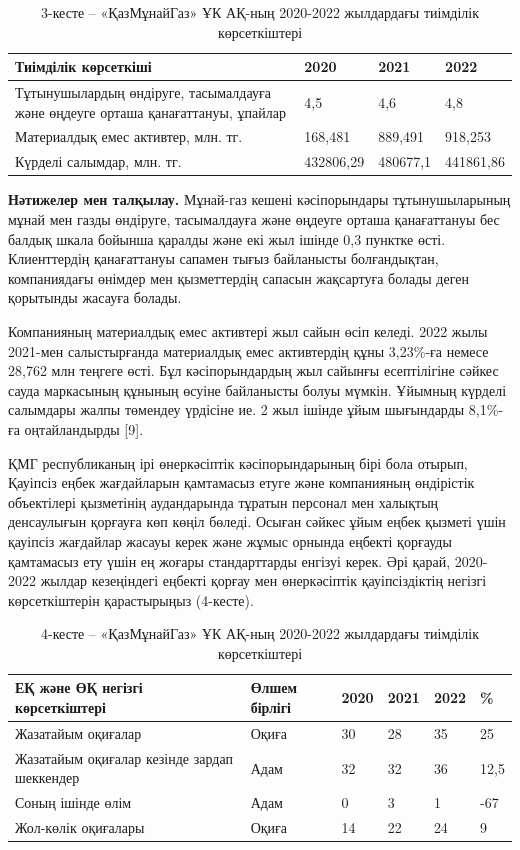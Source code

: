 \begin{table}[H]
\caption*{3-кесте -- «ҚазМұнайГаз» ҰК АҚ-ның 2020-2022 жылдардағы тиімділік көрсеткіштері}
\centering
\begin{tabular}{|p{}|l|l|l|}
\hline
Тиімділік көрсеткіші & 2020 & 2021 & 2022 \\ \hline
Тұтынушылардың өндіруге, тасымалдауға және өңдеуге орташа қанағаттануы, ұпайлар & 4,5 & 4,6 & 4,8 \\ \hline
Материалдық емес активтер, млн. тг. & 168,481 & 889,491 & 918,253 \\ \hline
Күрделі салымдар, млн. тг. & 432806,29 & 480677,1 & 441861,86 \\ \hline
\end{tabular}
\end{table}

\begin{multicols}{2}
{\bfseries Нәтижелер мен талқылау.} Мұнай-газ кешені кәсіпорындары
тұтынушыларының мұнай мен газды өндіруге, тасымалдауға және өңдеуге
орташа қанағаттануы бес балдық шкала бойынша қаралды және екі жыл ішінде
0,3 пунктке өсті. Клиенттердің қанағаттануы сапамен тығыз байланысты
болғандықтан, компаниядағы өнімдер мен қызметтердің сапасын жақсартуға
болады деген қорытынды жасауға болады.

Компанияның материалдық емес активтері жыл сайын өсіп келеді. 2022 жылы
2021-мен салыстырғанда материалдық емес активтердің құны 3,23\%-ға
немесе 28,762 млн теңгеге өсті. Бұл кәсіпорындардың жыл сайынғы
есептілігіне сәйкес сауда маркасының құнының өсуіне байланысты болуы
мүмкін. Ұйымның күрделі салымдары жалпы төмендеу үрдісіне ие. 2 жыл
ішінде ұйым шығындарды 8,1\%-ға оңтайландырды {[}9{]}.

ҚМГ республиканың ірі өнеркәсіптік кәсіпорындарының бірі бола отырып,
Қауіпсіз еңбек жағдайларын қамтамасыз етуге және компанияның өндірістік
объектілері қызметінің аудандарында тұратын персонал мен халықтың
денсаулығын қорғауға көп көңіл бөледі. Осыған сәйкес ұйым еңбек қызметі
үшін қауіпсіз жағдайлар жасауы керек және жұмыс орнында еңбекті қорғауды
қамтамасыз ету үшін ең жоғары стандарттарды енгізуі керек. Әрі қарай,
2020-2022 жылдар кезеңіндегі еңбекті қорғау мен өнеркәсіптік
қауіпсіздіктің негізгі көрсеткіштерін қарастырыңыз (4-кесте).
\end{multicols}

\begin{table}[H]
\caption*{4-кесте -- «ҚазМұнайГаз» ҰК АҚ-ның 2020-2022 жылдардағы тиімділік көрсеткіштері}
\centering
\begin{tabular}{|p{}|l|l|l|l|l|}
\hline
ЕҚ және ӨҚ негізгі көрсеткіштері & Өлшем бірлігі & 2020 & 2021 & 2022 & \% \\ \hline
Жазатайым оқиғалар & Оқиға & 30 & 28 & 35 & 25 \\ \hline
Жазатайым оқиғалар кезінде зардап шеккендер & Адам & 32 & 32 & 36 & 12,5 \\ \hline
Соның ішінде өлім & Адам & 0 & 3 & 1 & -67 \\ \hline
Жол-көлік оқиғалары & Оқиға & 14 & 22 & 24 & 9 \\ \hline
\end{tabular}
\end{table}

